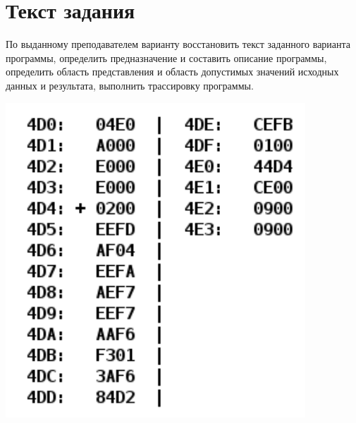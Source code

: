 \documentclass{article}
\begin{document}
\itmo[
  variant=15326,
  labn=3,
  discipline=Основы профессиональной деятельности,
  group=P3115,
  student=Владимир Мацюк,
  teacher=Абузов Ярослав
  Александрович,
  logo=../../../lib/img/itmo.png
]

\section{Текст задания}
По выданному преподавателем варианту восстановить текст заданного варианта программы, определить предназначение и составить описание программы, определить область представления и область допустимых значений исходных данных и результата, выполнить трассировку программы.
\begin{center}
  \includegraphics[scale=0.8]{task.png}
\end{center}
\end{document}
